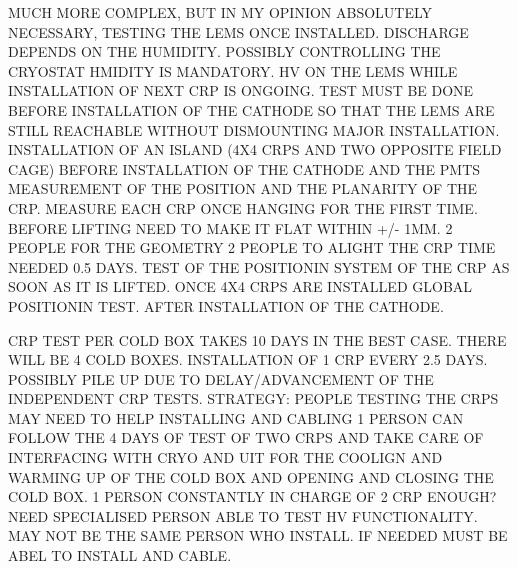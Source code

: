 MUCH MORE COMPLEX, BUT IN MY OPINION ABSOLUTELY NECESSARY, TESTING THE LEMS ONCE INSTALLED.
DISCHARGE DEPENDS ON THE HUMIDITY.
POSSIBLY CONTROLLING THE CRYOSTAT HMIDITY IS MANDATORY.
HV ON THE LEMS WHILE INSTALLATION OF NEXT CRP IS ONGOING.
TEST MUST BE DONE BEFORE INSTALLATION OF THE CATHODE SO THAT THE LEMS ARE STILL REACHABLE WITHOUT DISMOUNTING MAJOR INSTALLATION.
INSTALLATION OF AN ISLAND (4X4 CRPS AND TWO OPPOSITE FIELD CAGE)
BEFORE INSTALLATION OF THE CATHODE AND THE PMTS
MEASUREMENT OF THE POSITION AND THE PLANARITY OF THE CRP.
MEASURE EACH CRP ONCE HANGING FOR THE FIRST TIME.
BEFORE LIFTING NEED TO MAKE IT FLAT WITHIN +/- 1MM.
2 PEOPLE FOR THE GEOMETRY
2 PEOPLE TO ALIGHT THE CRP
TIME NEEDED 0.5 DAYS.
TEST OF THE POSITIONIN SYSTEM OF THE CRP AS SOON AS IT IS LIFTED.
ONCE 4X4 CRPS ARE INSTALLED GLOBAL POSITIONIN TEST.
AFTER INSTALLATION OF THE CATHODE.

CRP TEST PER COLD BOX TAKES 10 DAYS IN THE BEST CASE.
THERE WILL BE 4 COLD BOXES.
INSTALLATION OF 1 CRP EVERY 2.5 DAYS.
POSSIBLY PILE UP DUE TO DELAY/ADVANCEMENT OF THE INDEPENDENT CRP TESTS.
STRATEGY: PEOPLE TESTING THE CRPS MAY NEED TO HELP INSTALLING AND CABLING
1 PERSON CAN FOLLOW THE 4 DAYS OF TEST OF TWO CRPS AND TAKE CARE OF INTERFACING WITH CRYO AND UIT FOR THE COOLIGN AND WARMING UP OF THE COLD BOX AND OPENING AND CLOSING THE COLD BOX.
1 PERSON CONSTANTLY IN CHARGE OF 2 CRP ENOUGH?
NEED SPECIALISED PERSON ABLE TO TEST HV FUNCTIONALITY.
MAY NOT BE THE SAME PERSON WHO INSTALL.
IF NEEDED MUST BE ABEL TO INSTALL AND CABLE.

